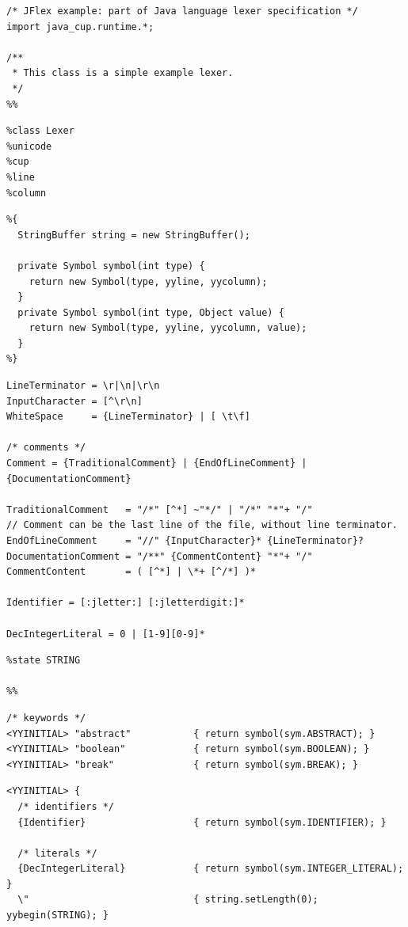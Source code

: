 \documentclass[11pt]{scrartcl}
\newcommand{\xtiny}{\small}
\begin{document}
{\xtiny
\label{CodeTop}\begin{verbatim}
/* JFlex example: part of Java language lexer specification */
import java_cup.runtime.*;

/**
 * This class is a simple example lexer.
 */
%%
\end{verbatim}
\label{CodeOptions}\begin{verbatim}
%class Lexer
%unicode
%cup
%line
%column
\end{verbatim}
\label{CodeScannerCode}\begin{verbatim}
%{
  StringBuffer string = new StringBuffer();

  private Symbol symbol(int type) {
    return new Symbol(type, yyline, yycolumn);
  }
  private Symbol symbol(int type, Object value) {
    return new Symbol(type, yyline, yycolumn, value);
  }
%}
\end{verbatim}
\label{CodeMacros}\begin{verbatim}
LineTerminator = \r|\n|\r\n
InputCharacter = [^\r\n]
WhiteSpace     = {LineTerminator} | [ \t\f]

/* comments */
Comment = {TraditionalComment} | {EndOfLineComment} | {DocumentationComment}

TraditionalComment   = "/*" [^*] ~"*/" | "/*" "*"+ "/"
// Comment can be the last line of the file, without line terminator.
EndOfLineComment     = "//" {InputCharacter}* {LineTerminator}?
DocumentationComment = "/**" {CommentContent} "*"+ "/"
CommentContent       = ( [^*] | \*+ [^/*] )*

Identifier = [:jletter:] [:jletterdigit:]*

DecIntegerLiteral = 0 | [1-9][0-9]*
\end{verbatim}
\label{CodeStateDecl}\begin{verbatim}
%state STRING

%%
\end{verbatim}
\label{CodeRulesYYINITIAL}\begin{verbatim}
/* keywords */
<YYINITIAL> "abstract"           { return symbol(sym.ABSTRACT); }
<YYINITIAL> "boolean"            { return symbol(sym.BOOLEAN); }
<YYINITIAL> "break"              { return symbol(sym.BREAK); }
\end{verbatim}
\label{CodeRulesBunch}\begin{verbatim}
<YYINITIAL> {
  /* identifiers */ 
  {Identifier}                   { return symbol(sym.IDENTIFIER); }
 
  /* literals */
  {DecIntegerLiteral}            { return symbol(sym.INTEGER_LITERAL); }
  \"                             { string.setLength(0); yybegin(STRING); }


\end{verbatim}}
\end{document}
